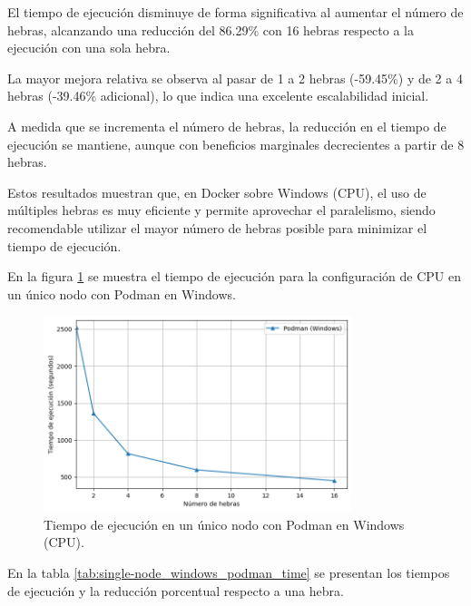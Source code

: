 El tiempo de ejecución disminuye de forma significativa al aumentar el número de hebras, alcanzando una reducción del 86.29\% con 16 hebras respecto a la ejecución con una sola hebra.

La mayor mejora relativa se observa al pasar de 1 a 2 hebras (-59.45\%) y de 2 a 4 hebras (-39.46\% adicional), lo que indica una excelente escalabilidad inicial.

A medida que se incrementa el número de hebras, la reducción en el tiempo de ejecución se mantiene, aunque con beneficios marginales decrecientes a partir de 8 hebras.

Estos resultados muestran que, en Docker sobre Windows (CPU), el uso de múltiples hebras es muy eficiente y permite aprovechar el paralelismo, siendo recomendable utilizar el mayor número de hebras posible para minimizar el tiempo de ejecución.

En la figura \ref{fig:single-node_windows_podman_time} se muestra el tiempo de ejecución para la configuración de CPU en un único nodo con Podman en Windows.

\begin{figure}[H]
    \centering
    \includegraphics[width=0.8\textwidth]{imagenes/cap5/single-node_windows_podman_time.png}
    \caption{Tiempo de ejecución en un único nodo con Podman en Windows (CPU).}
    \label{fig:single-node_windows_podman_time}
\end{figure}

En la tabla \ref{tab:single-node_windows_podman_time} se presentan los tiempos de ejecución y la reducción porcentual respecto a una hebra.


